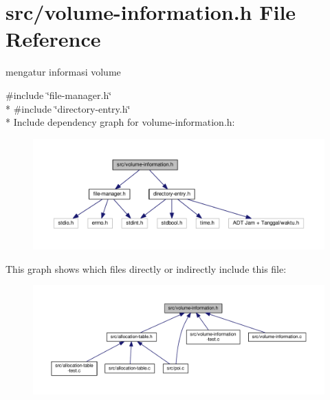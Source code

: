 \hypertarget{volume-information_8h}{\section{src/volume-\/information.h File Reference}
\label{volume-information_8h}
}


mengatur informasi volume  


{\ttfamily \#include \char`\"{}file-\/manager.\-h\char`\"{}}\\*
{\ttfamily \#include \char`\"{}directory-\/entry.\-h\char`\"{}}\\*
Include dependency graph for volume-\/information.h\-:\nopagebreak
\begin{figure}[H]
\begin{center}
\leavevmode
\includegraphics[width=350pt]{volume-information_8h__incl}
\end{center}
\end{figure}
This graph shows which files directly or indirectly include this file\-:\nopagebreak
\begin{figure}[H]
\begin{center}
\leavevmode
\includegraphics[width=350pt]{volume-information_8h__dep__incl}
\end{center}
\end{figure}
